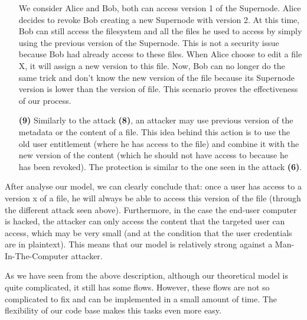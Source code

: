 \documentclass[../main.tex]{subfiles}
\begin{document}
\begin{itemize}
    \par We consider Alice and Bob, both can access version 1 of the Supernode. Alice decides to revoke Bob creating a new Supernode with version 2. At this time, Bob can still access the filesystem and all the files he used to access by simply using the previous version of the Supernode. This is not a security issue because Bob had already access to these files. When Alice choose to edit a file X, it will assign a new version to this file. Now, Bob can no longer do the same trick and don't know the new version of the file because its Supernode version is lower than the version of file. This scenario proves the effectiveness of our process.
    \item[\textbf{(9)}] Similarly to the attack \textbf{(8)}, an attacker may use previous version of the metadata or the content of a file. This idea behind this action is to use the old user entitlement (where he has access to the file) and combine it with the new version of the content (which he should not have access to because he has been revoked). The protection is similar to the one seen in the attack \textbf{(6)}.
\end{itemize}

\par After analyse our model, we can clearly conclude that: once a user has access to a version x of a file, he will always be able to access this version of the file (through the different attack seen above). Furthermore, in the case the end-user computer is hacked, the attacker can only access the content that the targeted user can access, which may be very small (and at the condition that the user credentials are in plaintext). This means that our model is relatively strong against a Man-In-The-Computer attacker.
\par As we have seen from the above description, although our theoretical model is quite complicated, it still has some flows. However, these flows are not so complicated to fix and can be implemented in a small amount of time. The flexibility of our code base makes this tasks even more easy.
\end{document}
